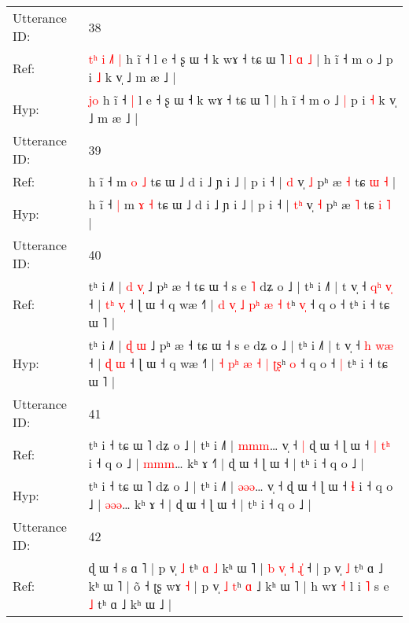 \documentclass[10pt]{article}
\DeclareRobustCommand{\hl}[1]{{\textcolor{red}{#1}}}
\begin{document}
\begin{longtable}{ll}
 \\
\midrule
Utterance ID: & 38 \\
Ref: & \hl{t}\hl{ʰ}\hl{ }\hl{i}\hl{ }\hl{˩}\hl{˥}\hl{ }\hl{|} h ĩ ˧\hl{}\hl{} l e ˧ ʂ ɯ ˧ k wɤ ˧ tɕ ɯ ˥\hl{ }\hl{l}\hl{ }\hl{ɑ}\hl{ }\hl{˩} | h ĩ ˧ m o ˩\hl{}\hl{} p i \hl{˩} k v̩ ˩ m æ ˩ |
 \\
Hyp: & \hl{}\hl{}\hl{}\hl{}\hl{}\hl{}\hl{}\hl{j}\hl{o} h ĩ ˧\hl{ }\hl{|} l e ˧ ʂ ɯ ˧ k wɤ ˧ tɕ ɯ ˥\hl{}\hl{}\hl{}\hl{}\hl{}\hl{} | h ĩ ˧ m o ˩\hl{ }\hl{|} p i \hl{˧} k v̩ ˩ m æ ˩ |
 \\
\midrule
Utterance ID: & 39 \\
Ref: & h ĩ ˧\hl{}\hl{} m \hl{o} \hl{˩} tɕ ɯ ˩ d i ˩ ɲ i ˩ | p i ˧ | \hl{}\hl{d} v̩ \hl{˩} pʰ æ \hl{˧} tɕ \hl{ɯ} \hl{˧} |
 \\
Hyp: & h ĩ ˧\hl{ }\hl{|} m \hl{ɤ} \hl{˧} tɕ ɯ ˩ d i ˩ ɲ i ˩ | p i ˧ | \hl{t}\hl{ʰ} v̩ \hl{˧} pʰ æ \hl{˥} tɕ \hl{i} \hl{˥} |
 \\
\midrule
Utterance ID: & 40 \\
Ref: & tʰ i ˩˥ | \hl{d} \hl{v}\hl{̩} ˩ pʰ æ ˧ tɕ ɯ ˧ s e\hl{ }\hl{˥} dʑ o ˩ | tʰ i ˩˥ | t v̩ ˧ \hl{q}\hl{ʰ} \hl{v}\hl{̩} ˧ | \hl{t}\hl{ʰ} \hl{v}\hl{̩} ˧ ɭ ɯ ˧ q wæ ˧˥ | \hl{d} \hl{v}\hl{̩} \hl{˩} \hl{p}\hl{ʰ} \hl{æ} \hl{˧}\hl{ }\hl{t}ʰ \hl{v}\hl{̩} ˧ q o ˧\hl{}\hl{} tʰ i ˧ tɕ ɯ ˥ |
 \\
Hyp: & tʰ i ˩˥ | \hl{ɖ} \hl{}\hl{ɯ} ˩ pʰ æ ˧ tɕ ɯ ˧ s e\hl{}\hl{} dʑ o ˩ | tʰ i ˩˥ | t v̩ ˧ \hl{}\hl{h} \hl{w}\hl{æ} ˧ | \hl{}\hl{ɖ} \hl{}\hl{ɯ} ˧ ɭ ɯ ˧ q wæ ˧˥ | \hl{˧} \hl{p}\hl{ʰ} \hl{æ} \hl{}\hl{˧} \hl{|} \hl{}\hl{ʈ}\hl{ʂ}ʰ \hl{}\hl{o} ˧ q o ˧\hl{ }\hl{|} tʰ i ˧ tɕ ɯ ˥ |
 \\
\midrule
Utterance ID: & 41 \\
Ref: & tʰ i ˧ tɕ ɯ ˥ dʑ o ˩ | tʰ i ˩˥ | \hl{m}\hl{m}\hl{m}… v̩ ˧\hl{ }\hl{|} ɖ ɯ ˧ ɭ ɯ ˧\hl{ }\hl{|} \hl{t}\hl{ʰ} i ˧ q o ˩ | \hl{m}\hl{m}\hl{m}… kʰ ɤ ˧\hl{˥} | ɖ ɯ ˧ ɭ ɯ ˧ | tʰ i ˧ q o ˩ |
 \\
Hyp: & tʰ i ˧ tɕ ɯ ˥ dʑ o ˩ | tʰ i ˩˥ | \hl{ə}\hl{ə}\hl{ə}… v̩ ˧\hl{}\hl{} ɖ ɯ ˧ ɭ ɯ ˧\hl{}\hl{} \hl{}\hl{ɬ} i ˧ q o ˩ | \hl{ə}\hl{ə}\hl{ə}… kʰ ɤ ˧\hl{} | ɖ ɯ ˧ ɭ ɯ ˧ | tʰ i ˧ q o ˩ |
 \\
\midrule
Utterance ID: & 42 \\
Ref: & ɖ ɯ ˧ s ɑ ˥ | p v̩ \hl{˩} tʰ \hl{ɑ} \hl{˩} kʰ ɯ ˥ |\hl{ }\hl{b}\hl{ }\hl{v}\hl{̩} \hl{˧} \hl{ɻ}\hl{̍} ˧ | p v̩ \hl{˩} tʰ ɑ ˩ kʰ ɯ ˥ | õ ˧ ʈʂ wɤ \hl{˧} | p v̩ \hl{˩} \hl{t}ʰ \hl{ɑ} ˩ kʰ ɯ ˥ | h wɤ\hl{}\hl{}\hl{} \hl{˧} l i \hl{˥} s e \hl{˩} tʰ ɑ ˩ kʰ ɯ ˩ |
 \\

\end{longtable}
\end{document}
